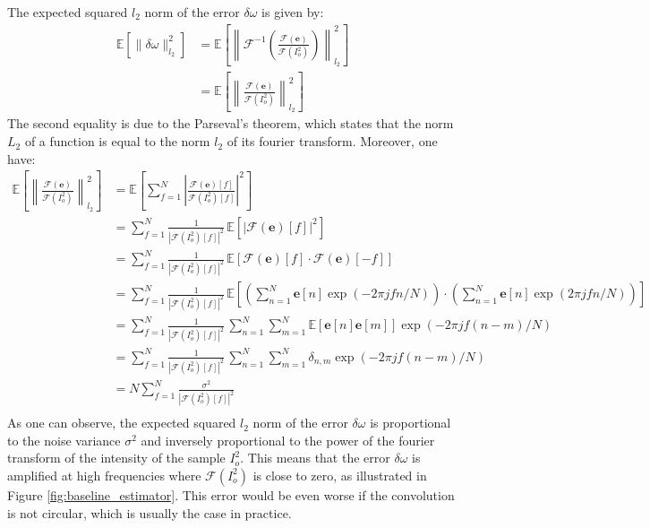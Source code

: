 \documentclass{article}
\begin{document}
The expected squared $l_2$ norm of the error $\delta \omega$ is given by:
\begin{align}
    \mathbb{E}[\|\delta\omega\|_{l_2}^2] & = \mathbb{E} \left[\left\|\mathcal{F}^{-1}\left(\frac{\mathcal{F}(\boldsymbol{e})}{\mathcal{F}(I_o^2)}\right) \right\|_{l_2}^2\right] \\
    & = \mathbb{E} \left[\left\|\frac{\mathcal{F}(\boldsymbol{e})}{\mathcal{F}(I_o^2)} \right\|_{l_2}^2\right] 
\end{align}
The second equality is due to the Parseval's theorem, which states that the norm $L_2$ of a function is equal to the norm $l_2$ of its fourier transform. Moreover, one have:
\begin{align}
    \mathbb{E} \left[\left\|\frac{\mathcal{F}(\boldsymbol{e})}{\mathcal{F}(I_o^2)} \right\|_{l_2}^2\right] & = \mathbb{E} \left[\sum_{f=1}^N \left|\frac{\mathcal{F}(\boldsymbol{e})[f]}{\mathcal{F}(I_o^2)[f]}\right|^2\right] \\
    & = \sum_{f=1}^N \frac{1}{|\mathcal{F}(I_o^2)[f]|^2} \, \mathbb{E} \left[|\mathcal{F}(\boldsymbol{e})[f]|^2\right] \\
    & = \sum_{f=1}^N \frac{1}{|\mathcal{F}(I_o^2)[f]|^2} \, \mathbb{E} \left[\mathcal{F}(\boldsymbol{e})[f] \cdot \mathcal{F}(\boldsymbol{e})[-f] \right] \\
    & = \sum_{f=1}^N \frac{1}{|\mathcal{F}(I_o^2)[f]|^2} \, \mathbb{E} \left[\left(\sum_{n=1}^{N}\boldsymbol{e}[n] \exp(-2\pi j f n / N)\right) \cdot \left(\sum_{n=1}^{N}\boldsymbol{e}[n] \exp(2\pi j f n / N)\right)   \right] \\
    & = \sum_{f=1}^N \frac{1}{|\mathcal{F}(I_o^2)[f]|^2} \, \sum_{n=1}^{N} \sum_{m=1}^{N} 
    \mathbb{E}[\boldsymbol{e}[n] \boldsymbol{e}[m]] \exp(-2\pi j f (n-m) / N) \\
    & = \sum_{f=1}^N \frac{1}{|\mathcal{F}(I_o^2)[f]|^2} \, \sum_{n=1}^{N} \sum_{m=1}^{N} \delta_{n,m} \exp(-2\pi j f (n-m) / N) \\
    & = N \sum_{f=1}^N \frac{\sigma^2}{|\mathcal{F}(I_o^2)[f]|^2} \\
\end{align}
As one can observe, the expected squared $l_2$ norm of the error $\delta \omega$ is proportional to the noise variance $\sigma^2$ and inversely proportional to the power of the fourier transform of the intensity of the sample $I_o^2$. This means that the error $\delta \omega$ is amplified at high frequencies where $\mathcal{F}(I_o^2)$ is close to zero, as illustrated in Figure \ref{fig:baseline_estimator}. This error would be even worse if the convolution is not circular, which is usually the case in practice. 
\end{document}
